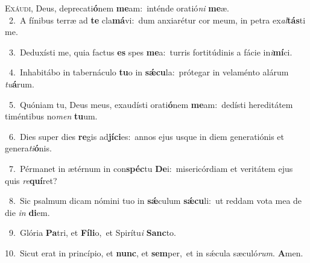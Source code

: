 \lettrine{\initial\textcolor{\initialcolor}{E}}{xáudi,} Deus, deprecati\-\textbf{ó}\-nem \textbf{me}\-am:~\star inténde oratió\textit{ni} \textbf{me}\-æ.\\
{\numbfont\textcolor{\numbcolor}{~2.}}~A fínibus terræ ad \textbf{te} cla\-\textbf{má}\-vi:~\star dum anxiarétur cor meum, in petra ex\-\textit{al}\-\textbf{tás}ti me.\par
{\numbfont\textcolor{\numbcolor}{~3.}}~Deduxísti me, quia factus \textbf{es} spes \textbf{me}\-a:~\star turris fortitúdinis a fácie in\-\textit{i}\-\textbf{mí}ci.\par
{\numbfont\textcolor{\numbcolor}{~4.}}~Inhabitábo in tabernáculo \textbf{tu}\-o in \textbf{sǽ}\-\textbf{cu}la:~\star prótegar in velaménto alárum \textit{tu}\-\textbf{á}rum.\par
{\numbfont\textcolor{\numbcolor}{~5.}}~Quóniam tu, Deus meus, exaudísti orati\-\textbf{ó}\-nem \textbf{me}\-am:~\star dedísti hereditátem timéntibus no\textit{men} \textbf{tu}\-um.\par
{\numbfont\textcolor{\numbcolor}{~6.}}~Dies super dies \textbf{re}\-gis ad\-\textbf{jí}\-\textbf{ci}es:~\star annos ejus usque in diem generatiónis et genera\-\textit{ti}\-\textbf{ó}nis.\par
{\numbfont\textcolor{\numbcolor}{~7.}}~Pérmanet in ætérnum in con\-\textbf{spéc}\-tu \textbf{De}\-i:~\star misericórdiam et veritátem ejus quis \textit{re}\-\textbf{quí}ret?\par
{\numbfont\textcolor{\numbcolor}{~8.}}~Sic psalmum dicam nómini tuo in \textbf{sǽ}\-culum \textbf{sǽ}\-\textbf{cu}li:~\star ut reddam vota mea de die \textit{in} \textbf{di}\-em.\par
{\numbfont\textcolor{\numbcolor}{~9.}}~Glória \textbf{Pa}\-tri, et \textbf{Fí}\-\textbf{li}o,~\star et Spirítu\textit{i} \textbf{Sanc}\-to.\par
{\numbfont\textcolor{\numbcolor}{10.}}~Sicut erat in princípio, et \textbf{nunc}\-, et \textbf{sem}\-per,~\star et in sǽcula sæculó\-\textit{rum}\-. \textbf{A}\-men.\par
